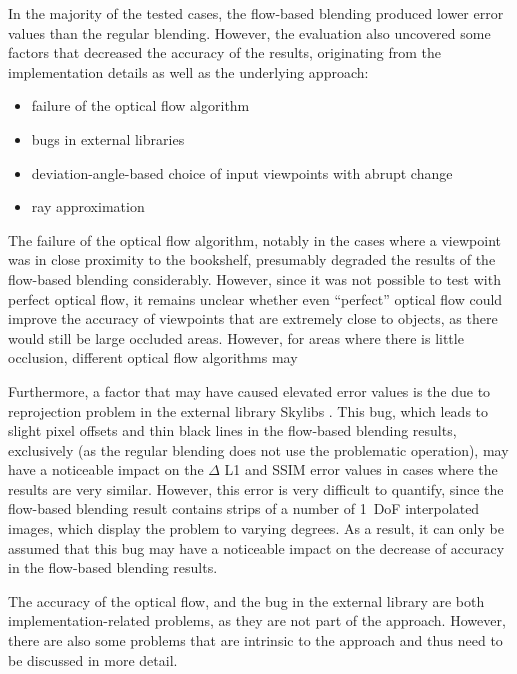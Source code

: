 In the majority of the tested cases, the flow-based blending produced lower error values than the regular blending. However, the evaluation also uncovered some factors that decreased the accuracy of the results, originating from the implementation details as well as the underlying approach:

\begin{itemize}
  \item failure of the optical flow algorithm
  \item bugs in external libraries
  \item deviation-angle-based choice of input viewpoints with abrupt change
  \item ray approximation
\end{itemize}

The failure of the optical flow algorithm, notably in the cases where a viewpoint was in close proximity to the bookshelf, presumably degraded the results of the flow-based blending considerably. However, since it was not possible to test with perfect optical flow, it remains unclear whether even ``perfect'' optical flow could improve the accuracy of viewpoints that are extremely close to objects, as there would still be large occluded areas. However, for areas where there is little occlusion, different optical flow algorithms may 

Furthermore, a factor that may have caused elevated error values is the due to reprojection problem in the external library Skylibs \cite{skylibs}. This bug, which leads to slight pixel offsets and thin black lines in the flow-based blending results, exclusively (as the regular blending does not use the problematic operation), may have a noticeable impact on the $\Delta$ L1 and SSIM error values in cases where the results are very similar. However, this error is very difficult to quantify, since the flow-based blending result contains strips of a number of 1~DoF interpolated images, which display the problem to varying degrees. As a result, it can only be assumed that this bug may have a noticeable impact on the decrease of accuracy in the flow-based blending results.

The accuracy of the optical flow, and the bug in the external library are both implementation-related problems, as they are not part of the approach. However, there are also some problems that are intrinsic to the approach and thus need to be discussed in more detail.

